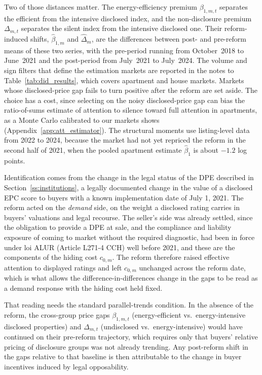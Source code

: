Two of those distances matter. The energy-efficiency premium $\beta_{1,m,t}$ separates the efficient from the intensive disclosed index, and the non-disclosure premium $\Delta_{m,t}$ separates the silent index from the intensive disclosed one. Their reform-induced shifts, $\hat\beta_{1,m}$ and $\hat\Delta_m$, are the differences between post- and pre-reform means of these two series, with the pre-period running from October~2018 to June~2021 and the post-period from July~2021 to July~2024. The volume and sign filters that define the estimation markets are reported in the notes to Table~\ref{tab:did_results}, which covers \attNMarketsApt{} apartment and \attNMarketsHouse{} house markets. Markets whose disclosed-price gap fails to turn positive after the reform are set aside. The choice has a cost, since selecting on the noisy disclosed-price gap can bias the ratio-of-sums estimate of attention to silence toward full attention in apartments, as a Monte Carlo calibrated to our markets shows (Appendix~\ref{app:att_estimator}). The structural moments use listing-level data from 2022 to 2024, because the market had not yet repriced the reform in the second half of 2021, when the pooled apartment estimate $\hat\beta_1$ is about $-1.2$ log points.

Identification comes from the change in the legal status of the DPE described in Section~\ref{ss:institutions}, a legally documented change in the value of a disclosed EPC score to buyers with a known implementation date of July 1, 2021. The reform acted on the \emph{demand} side, on the weight a disclosed rating carries in buyers' valuations and legal recourse. The seller's side was already settled, since the obligation to provide a DPE at sale, and the compliance and liability exposure of coming to market without the required diagnostic, had been in force under loi ALUR (Article L271-4 CCH) well before 2021, and these are the components of the hiding cost $c_{0,m}$. The reform therefore raised effective attention to displayed ratings and left $c_{0,m}$ unchanged across the reform date, which is what allows the difference-in-differences change in the gaps to be read as a demand response with the hiding cost held fixed.

That reading needs the standard parallel-trends condition. In the absence of the reform, the cross-group price gaps $\beta_{1,m,t}$ (energy-efficient vs.\ energy-intensive disclosed properties) and $\Delta_{m,t}$ (undisclosed vs.\ energy-intensive) would have continued on their pre-reform trajectory, which requires only that buyers' relative pricing of disclosure groups was not already trending. Any post-reform shift in the gaps relative to that baseline is then attributable to the change in buyer incentives induced by legal opposability.

